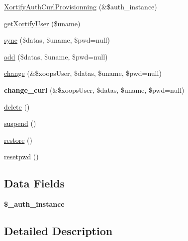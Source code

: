 \begin{DoxyCompactItemize}
\item 
\hyperlink{class_xortify_auth_curl_provisionning_ae3322c493c27ac523093137bf532b541}{Xortify\-Auth\-Curl\-Provisionning} (\&\$auth\-\_\-instance)
\item 
\hyperlink{class_xortify_auth_curl_provisionning_a041d726ac26672547ed1504e8e0117aa}{get\-Xortify\-User} (\$uname)
\item 
\hyperlink{class_xortify_auth_curl_provisionning_a35dc08b0f2138eb818ff95345b73bcff}{sync} (\$datas, \$uname, \$pwd=null)
\item 
\hyperlink{class_xortify_auth_curl_provisionning_adfc9fcef01e7bd7b2f47e8e79d51fc63}{add} (\$datas, \$uname, \$pwd=null)
\item 
\hyperlink{class_xortify_auth_curl_provisionning_ae1f0971b9712c794620cf309164e43af}{change} (\&\$xoops\-User, \$datas, \$uname, \$pwd=null)
\item 
\hypertarget{class_xortify_auth_curl_provisionning_aba6f598c234d191a3b3934f90b35fd9f}{{\bfseries change\-\_\-curl} (\&\$xoops\-User, \$datas, \$uname, \$pwd=null)}\label{class_xortify_auth_curl_provisionning_aba6f598c234d191a3b3934f90b35fd9f}

\item 
\hyperlink{class_xortify_auth_curl_provisionning_a13bdffdd926f26b825ea57066334ff01}{delete} ()
\item 
\hyperlink{class_xortify_auth_curl_provisionning_ad73006a505121228f3b075c2409787d2}{suspend} ()
\item 
\hyperlink{class_xortify_auth_curl_provisionning_aa1371f22826cf8cde4454c9b467203d0}{restore} ()
\item 
\hyperlink{class_xortify_auth_curl_provisionning_a06d70fbd3a2db390b6f2530c0076628e}{resetpwd} ()
\end{DoxyCompactItemize}
\subsection*{Data Fields}
\begin{DoxyCompactItemize}
\item 
\hypertarget{class_xortify_auth_curl_provisionning_a486ed878bb5a7188c99ac4c9ee46ac6e}{{\bfseries \$\-\_\-auth\-\_\-instance}}\label{class_xortify_auth_curl_provisionning_a486ed878bb5a7188c99ac4c9ee46ac6e}

\end{DoxyCompactItemize}


\subsection{Detailed Description}


